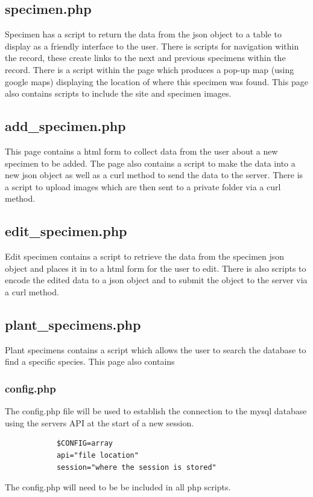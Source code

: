 \begin{itemize}
		
	\subsection{specimen.php}
		Specimen has a script to return the data from the json object to a table to display as a friendly interface to the user. There is scripts for navigation within the record, these create links to the next and previous specimens within the record. There is a script within the page which produces a pop-up map (using google maps) displaying the location of where this specimen was found. This page also contains scripts to include the site and specimen images.

		
	\subsection{add\_specimen.php}
		This page contains a html form to collect data from the user about a new specimen to be added. The page also contains a script to make the data into a new json object as well as a curl method to send the data to the server. There is a script to upload images which are then sent to a private folder via a curl method.

		
	\subsection{edit\_specimen.php}
		Edit specimen contains a script to retrieve the data from the specimen json object and places it in to a html form for the user to edit. There is also scripts to encode the edited data to a json object and to submit the object to the server via a curl method.

		
	\subsection{plant\_specimens.php}
		Plant specimens contains a script which allows the user to search the database to find a specific species. This page also contains 


	\subsubsection{config.php}
		The config.php file will be used to establish the connection to the mysql database using the servers API at the start of a new session.
		\begin{verbatim}
			$CONFIG=array
			api="file location"
			session="where the session is stored"
		\end{verbatim}
		The config.php will need to be be included in all php scripts.



\end{itemize}
